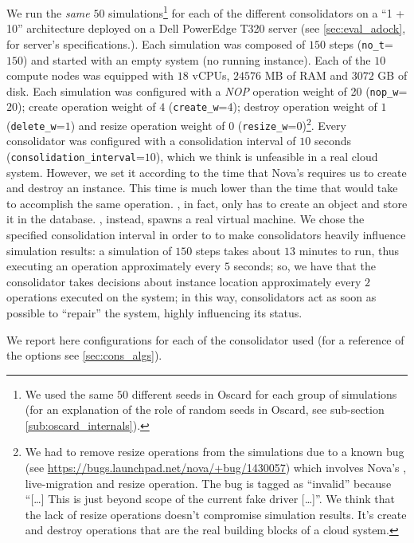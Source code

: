 We run the \emph{same} $50$ simulations\footnote{We used the same $50$ different seeds in Oscard for each group of simulations (for an explanation of the role of random seeds in Oscard, see sub-section \ref{sub:oscard_internals}).} for each of the different consolidators on a ``1 + 10'' architecture deployed on a Dell PowerEdge T320 server (see \ref{sec:eval_adock}, for server's specifications.). Each simulation was composed of $150$ steps (\texttt{no\_t}=$150$) and started with an empty system (no running instance). Each of the $10$ compute nodes was equipped with $18$ vCPUs, $24576$ MB of RAM and $3072$ GB of disk.
Each simulation was configured with a \textit{NOP} operation weight of 20 (\texttt{nop\_w}=$20$); create operation weight of $4$ (\texttt{create\_w}=$4$); destroy operation weight of $1$ (\texttt{delete\_w}=$1$) and resize operation weight of $0$ (\texttt{resize\_w}=$0$)\footnote{We had to remove resize operations from the simulations due to a known bug (see \url{https://bugs.launchpad.net/nova/+bug/1430057}) which involves Nova's , live-migration and resize operation. The bug is tagged as ``invalid'' because ``[\ldots] This is just beyond scope of the current fake driver [\ldots]''. We think that the lack of resize operations doesn't compromise simulation results. It's create and destroy operations that are the real building blocks of a cloud system.}. Every consolidator was configured with a consolidation interval of $10$ seconds (\texttt{consolidation\_interval}=$10$), which we think is unfeasible in a real cloud system. However, we set it according to the time that Nova's  requires us to create and destroy an instance. This time is much lower than the time that would take  to accomplish the same operation. , in fact, only has to create an object and store it in the database. , instead, spawns a real virtual machine. We chose the specified consolidation interval in order to to make consolidators heavily influence simulation results: a simulation of $150$ steps takes about $13$ minutes to run, thus executing an operation approximately every $5$ seconds; so, we have that the consolidator takes decisions about instance location approximately every $2$ operations executed on the system; in this way, consolidators act as soon as possible to ``repair'' the system, highly influencing its status.

We report here configurations for each of the consolidator used (for a reference of the options see \ref{sec:cons_algs}).

